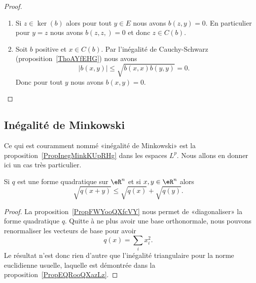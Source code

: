 \begin{proof}
    \begin{enumerate}
        \item
            Si \( z\in\ker(b)\) alors pour tout \( y\in E\) nous avons \( b(z,y)=0\). En particulier pour \( y=z\) nous avons \( b(z,z,)=0\) et donc \( z\in C(b)\).
        \item
            Soit \( b\) positive et \( x\in C(b)\). Par l'inégalité de Cauchy-Schwarz (proposition~\ref{ThoAYfEHG}) nous avons
            \begin{equation}
                | b(x,y) |\leq \sqrt{   b(x,x)b(y,y) }=0.
            \end{equation}
            Donc pour tout \( y\) nous avons \( b(x,y)=0\).
    \end{enumerate}
\end{proof}

\subsection{Inégalité de Minkowski}

Ce qui est couramment nommé «inégalité de Minkowski» est la proposition~\ref{PropInegMinkKUpRHg} dans les espaces \( L^p\). Nous allons en donner ici un cas très particulier.

\begin{proposition} \label{PropACHooLtsMUL}
    Si \( q\) est une forme quadratique sur \( \eR^n\) et si \( x,y\in \eR^n\) alors
    \begin{equation}
        \sqrt{q(x+y)}\leq\sqrt{q(x)}+\sqrt{q(y)}.
    \end{equation}
\end{proposition}

\begin{proof}
    La proposition~\ref{PropFWYooQXfcVY} nous permet de «diagonaliser» la forme quadratique \( q\). Quitte à ne plus avoir une base orthonormale, nous pouvons renormaliser les vecteurs de base pour avoir
    \begin{equation}
        q(x)=\sum_ix_i^2.
    \end{equation}
    Le résultat n'est donc rien d'autre que l'inégalité triangulaire pour la norme euclidienne usuelle, laquelle est démontrée dans la proposition~\ref{PropEQRooQXazLz}.
\end{proof}


